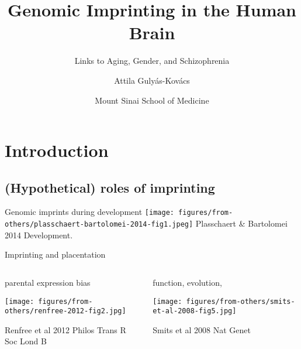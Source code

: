 \documentclass{beamer}
\title{Genomic Imprinting in the Human Brain}
\subtitle{Links to Aging, Gender, and Schizophrenia}
\author{Attila Guly\'{a}s-Kov\'{a}cs}
\date{Mount Sinai School of Medicine}
\begin{document}
\maketitle

\section{Introduction}
\subsection{(Hypothetical) roles of imprinting}

\begin{frame}{Genomic imprints during development}
\texttt{[image: figures/from-others/plasschaert-bartolomei-2014-fig1.jpeg]}
\vfill
{\tiny Plasschaert \& Bartolomei 2014 Development.}
\end{frame}

\begin{frame}{Imprinting and placentation}{}
\begin{columns}[t]
\begin{column}{0.4\textwidth}

parental expression bias

\texttt{[image: figures/from-others/renfree-2012-fig2.jpg]}

{\tiny Renfree et al 2012 Philos Trans R Soc Lond B}

\end{column}

\begin{column}{0.6\textwidth}

function, evolution,

\texttt{[image: figures/from-others/smits-et-al-2008-fig5.jpg]}

{\tiny Smits et al 2008 Nat Genet}
\end{column}
\end{columns}
\begin{center}
\end{center}
\end{frame}
\end{document}
